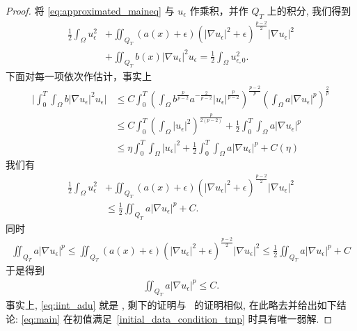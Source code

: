 \documentclass[twoside,longtitle]{LZUthesis}
\theoremstyle{definition}
\numberwithin{equation}{chapter}
\newcommand*\abs[1]{\lvert#1\rvert}
\begin{document}
\begin{proof}
	将 \cref{eq:approximated_maineq} 与 $u_\epsilon$ 作乘积，并作 $Q_T$ 上的积分, 我们得到
	\begin{equation}
		\begin{split}
			\frac{1}{2} \int_{\Omega} u_{\epsilon}^{2}
			&+\iint_{Q_{T}}(a(x)+\epsilon)\left(\left|\nabla u_{\epsilon}\right|^{2}+\epsilon\right)^{\frac{p-2}{2}}\left|\nabla u_{\epsilon}\right|^{2}\\
			&+\iint_{Q_{T}} b(x)\left|\nabla u_{\epsilon}\right|^{2} u_{\epsilon}  =\frac{1}{2} \int_{\Omega} u_{\epsilon, 0}^{2}.
		\end{split}
	\end{equation}
	下面对每一项依次作估计，事实上
	\begin{equation}
		\begin{split}
			\abs{\int_0^T\int_{\Omega} b\abs{\nabla u_{\epsilon}}^2u_{\epsilon}}
			&\leq C\int_0^T\left( \int_{\Omega} b^{\frac{p}{p-2}}a^{-\frac{2}{p-2}}\abs{u_{\epsilon}}^{\frac{p}{p-2}} \right)^{\frac{p-2}{p}}
			\left(  \int_{\Omega} a\abs{\nabla u_{\epsilon}}^p \right)^{\frac{2}{p}}\\
			&\leq C\int_0^T\left(\int_{\Omega}\abs{u_{\epsilon}}^2\right)^{\frac{p}{2(p-2)}} + \frac{1}{2}\int_0^T\int_{\Omega} a\abs{\nabla u_{\epsilon}}^p\\
			&\leq \eta\int_0^T\int_{\Omega}\abs{u_{\epsilon}}^2 + \frac{1}{2}\int_0^T\int_{\Omega} a\abs{\nabla u_{\epsilon}}^p + C(\eta)
		\end{split}
	\end{equation}
	我们有
	\begin{equation}
		\begin{split}
			\frac{1}{2} \int_{\Omega} u_{\epsilon}^{2}
			&+\iint_{Q_{T}}(a(x)+\epsilon)\left(\left|\nabla u_{\epsilon}\right|^{2}+\epsilon\right)^{\frac{p-2}{2}}\left|\nabla u_{\epsilon}\right|^{2}\\
			&\leq \frac{1}{2}\iint_{Q_T}a\abs{\nabla u_\epsilon}^p + C.
		\end{split}
	\end{equation}
	同时
	\begin{equation}
		\begin{split}
			\iint_{Q_T}a\abs{\nabla u_\epsilon}^p
			\leq \iint_{Q_{T}}(a(x)+\epsilon)\left(\left|\nabla u_{\epsilon}\right|^{2}+\epsilon\right)^{\frac{p-2}{2}}\left|\nabla u_{\epsilon}\right|^{2}
			\leq \frac{1}{2}\iint_{Q_T}a\abs{\nabla u_\epsilon}^p + C
		\end{split}
	\end{equation}
	于是得到
	\begin{equation}\label{eq:iint_adu}
		\begin{split}
			\iint_{Q_T}a\abs{\nabla u_\epsilon}^p \leq C.
		\end{split}
	\end{equation}
	事实上, \cref{eq:iint_adu} 就是 \cite[thm 1.3 eq. (2.5)]{Zhan2019Uniquenessa},
	剩下的证明与~\cite[thm 1.3]{Zhan2019Uniquenessa} 的证明相似, 在此略去并给出如下结论:
	\cref{eq:main} 在初值满足~\eqref{initial_data_condition_tmp} 时具有唯一弱解.


\end{proof}
\end{document}
